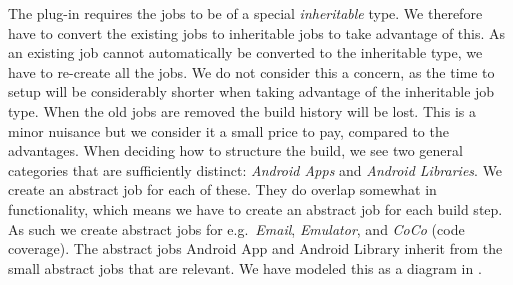 The plug-in requires the jobs to be of a special \emph{inheritable} type. We therefore have to convert the existing jobs to inheritable jobs to take advantage of this. As an existing job cannot automatically be converted to the inheritable type, we have to re-create all the jobs. We do not consider this a concern, as the time to setup will be considerably shorter when taking advantage of the inheritable job type. When the old jobs are removed the build history will be lost. This is a minor nuisance but we consider it a small price to pay, compared to the advantages. When deciding how to structure the build, we see two general categories that are sufficiently distinct: \emph{Android Apps} and \emph{Android Libraries}. We create an abstract job for each of these. They do overlap somewhat in functionality, which means we have to create an abstract job for each build step. As such we create abstract jobs for e.g.\ \emph{Email}, \emph{Emulator}, and \emph{CoCo} (code coverage). The abstract jobs Android App and Android Library inherit from the small abstract jobs that are relevant. We have modeled this as a diagram in .

